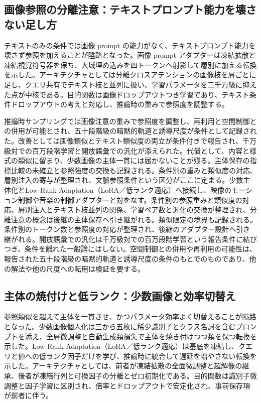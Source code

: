 \documentclass[lualatex,a4paper,10pt]{jlreq}
\begin{document}
\subsection{画像参照の分離注意：テキストプロンプト能力を壊さない足し方}
テキストのみの条件では画像 prompt の能力がなく、テキストプロンプト能力を壊さず参照を加えることが隘路となった。画像 prompt アダプターは凍結拡散と凍結視覚符号器を保ち、大域埋め込みを四トークンへ射影して層別に加える転換を示した\autocite{btd038}。アーキテクチャとしては分離クロスアテンションの画像枝を層ごとに足し、クエリ共有でテキスト枝と並列に扱い、学習パラメータを二千万級に抑えた点が中核である\autocite{btd038}。目的関数は画像ドロップアウトつき学習であり、テキスト条件ドロップアウトの考えと対応し、推論時の重みで参照度を調整する\autocite{btd038}。

推論時サンプリングでは画像注意の重みで参照度を調整し、再利用と空間制御との併用が可能とされ、五十段階級の暗黙的軌道と誘導尺度が条件として記録された\autocite{btd038}。改善としては画像類似とテキスト類似度の両立が条件付きで報告され、千万級対での百万段階学習と開放語彙での汎化が添えられた\autocite{btd038}。代償として、内容と様式の類似に留まり、少数画像の主体一貫には届かないことが残る\autocite{btd038}。主体保存の指標比較の未確立と参照強度の交換も記録される。条件別の重みと類似度の対応、層別注入の寄与が整理され、文脈参照条件という区分がここに定まる。少数主体化とLow-Rank Adaptation（LoRA／低ランク適応）へ接続し、映像のモーション制御や音楽の制御アダプターと対をなす。条件別の参照重みと類似度の対応、層別注入とテキスト枝並列の関係、学習ペア数と汎化の交換が整理され、分離注意の概念は後継の主体保存へ引き継がれる\autocite{btd038}。類似限定の境界も記録される。条件別のトークン数と参照度の対応が整理され、後継のアダプター設計へ引き継がれる。開放語彙での汎化は千万級対での百万段階学習という報告条件に結びつき、条件を離れた一般論にはしない\autocite{btd038}。空間制御との併用や再利用の可能性は、報告された五十段階級の暗黙的軌道と誘導尺度の条件のもとでのものであり、他の解法や他の尺度への転用は検証を要する\autocite{btd038}。

\subsection{主体の焼付けと低ランク：少数画像と効率切替え}
参照類似を超えて主体を一貫させ、かつパラメータ効率よく切替えることが隘路となった。少数画像個人化は三から五枚に稀少識別子とクラス名詞を含むプロンプトを添え、全層微調整と自動生成類損失で主体を焼き付けつつ類を保つ転換を示した\autocite{btd039}。Low-Rank Adaptation（LoRA／低ランク適応）は基底を凍結し、クエリと値への低ランク因子だけを学び、推論時に統合して遅延を増やさない転換を示した\autocite{btd040}。アーキテクチャとしては、前者が凍結拡散の全面微調整と超解像の継承、後者が凍結行列と可換因子の分離とゼロ初期化である\autocite{btd039,btd040}。目的関数は識別子微調整と因子学習に区別され、倍率とドロップアウトで安定化され、事前保存項が前者に伴う\autocite{btd039,btd040}。
\end{document}
